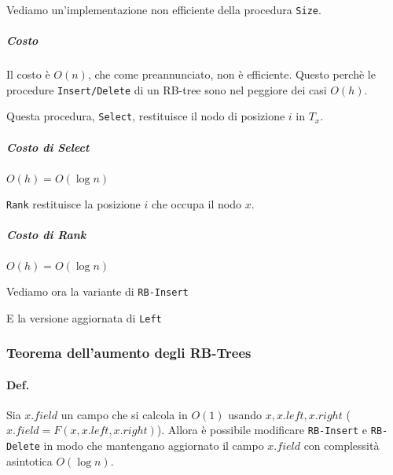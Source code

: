 \begin{center}
\end{center}

Vediamo un'implementazione non efficiente della procedura \texttt{Size}.

 

\subparagraph{Costo} Il costo è $O(n)$, che come preannunciato, non è efficiente.
Questo perchè le procedure \texttt{Insert/Delete} di un RB-tree sono nel peggiore dei casi $O(h)$.

\bigskip Questa procedura, \texttt{Select}, restituisce il nodo di posizione $i$
in $T_x$.

 

\subparagraph{Costo di Select} $O(h) = O(\log n)$

\texttt{Rank} restituisce la posizione $i$ che occupa il nodo $x$.



\subparagraph{Costo di Rank} $O(h) = O(\log n)$

\bigskip Vediamo ora la variante di \texttt{RB-Insert} 



E la versione aggiornata di \texttt{Left}



\subsubsection{Teorema dell'aumento degli RB-Trees}

\paragraph{Def.} Sia $x.field$ un campo che si calcola in $O(1)$
usando $x, x.left, x.right$ ($x.field = F(x, x.left, x.right)$).
Allora è possibile modificare \texttt{RB-Insert} e \texttt{RB-Delete}
in modo che mantengano aggiornato il campo $x.field$ con complessità
asintotica $O(\log n)$.


